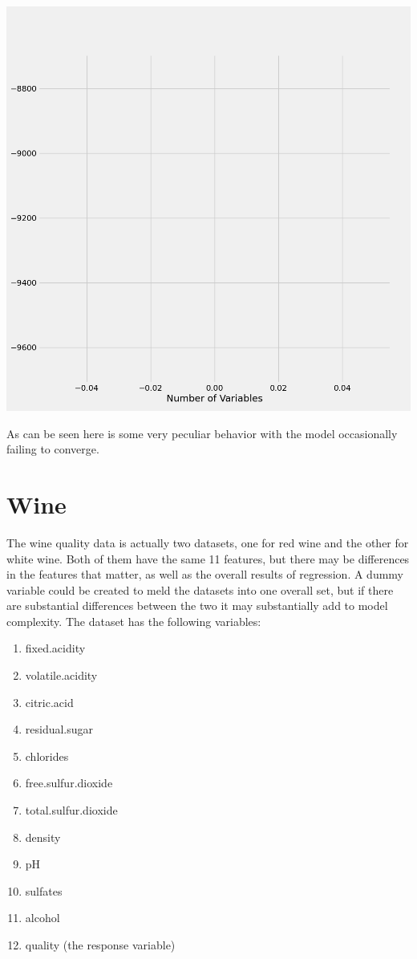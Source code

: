 \documentclass{article}
\begin{document}
	\includegraphics[scale = 0.2]{../plots/python/AICConcreteStepwise4L.png}
	
	As can be seen here is some very peculiar behavior with the model 
	occasionally failing to converge. 
	
	\section{Wine}
	
	The wine quality data is actually two datasets, one for red wine and the other for white 
	wine. Both of them have the same 11 features, but there may be differences in the features 
	that matter, as well as the overall results of regression. A dummy variable could be created 
	to meld the datasets into one overall set, but if there are substantial differences between 
	the two it may substantially add to model complexity. The dataset has the following variables: 
	
	\begin{enumerate}
		\item fixed.acidity 
		\item volatile.acidity 
		\item citric.acid 
		\item residual.sugar 
		\item chlorides 
		\item free.sulfur.dioxide 
		\item total.sulfur.dioxide 
		\item density
		\item pH
		\item sulfates 
		\item alcohol 
		\item quality (the response variable)
	\end{enumerate}
\end{document}
